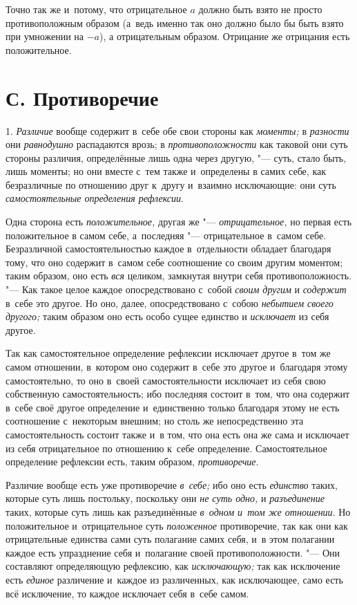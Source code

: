 Точно так же и~потому, что отрицательное $a$ должно
быть взято не просто противоположным образом (а~ведь именно так оно должно
было бы быть взято при умножении на $-a$), а
отрицательным образом. Отрицание же отрицания есть положительное.

\section[С. Противоречие]{С. Противоречие}
1. {\em Различие} вообще содержит в~себе обе свои стороны
как {\em моменты;} в {\em разности} они {\em равнодушно}
распадаются врозь; в {\em противоположности} как
таковой они суть стороны различия, определённые лишь одна через другую, "---
суть, стало быть, лишь моменты; но они вместе с~тем также и~определены в
самих себе, как безразличные по отношению друг к~другу и~взаимно
исключающие: они суть {\em самостоятельные определения рефлексии}.

Одна сторона есть {\em положительное,} другая же
"--- {\em отрицательное,} но первая есть положительное в
самом себе, а~последняя "--- отрицательное в~самом себе. Безразличной
самостоятельностью каждое в~отдельности обладает благодаря тому, что оно
содержит в~самом себе соотношение со своим другим моментом; таким образом,
оно есть {\em вся} целиком, замкнутая внутри себя
противоположность. "--- Как такое целое каждое опосредствовано с~собой
{\em своим другим} и {\em содержит}
в~себе это другое. Но оно, далее, опосредствовано с~собою
{\em небытием своего другого;} таким образом оно есть
особо сущее единство и {\em исключает} из себя другое.

Так как самостоятельное определение рефлексии исключает другое в~том же
самом отношении, в~котором оно содержит в~себе это другое и~благодаря этому
самостоятельно, то оно в~своей самостоятельности исключает из себя свою
собственную самостоятельность; ибо последняя состоит в~том, что она
содержит в~себе своё другое определение и~единственно только благодаря
этому не есть соотношение с~некоторым внешним; но столь же непосредственно
эта самостоятельность состоит также и~в том, что она есть она же сама и
исключает из себя отрицательное по отношению к~себе определение.
Самостоятельное определение рефлексии есть, таким образом, {\em противоречие}.

Различие вообще есть уже противоречие {\em в~себе;} ибо
оно есть {\em единство} таких, которые суть лишь
постольку, поскольку они {\em не суть одно,} и
{\em разъединение} таких, которые суть лишь как
разъединённые {\em в~одном и~том же отношении}. Но
положительное и~отрицательное суть {\em положенное}
противоречие, так как они как отрицательные единства сами суть полагание
самих себя, и~в этом полагании каждое есть упразднение себя и~полагание
своей противоположности. "--- Они составляют определяющую рефлексию, как
{\em исключающую;} так как исключение есть
{\em единое} различение и~каждое из различенных, как
исключающее, само есть всё исключение, то каждое исключает себя в~себе самом.

